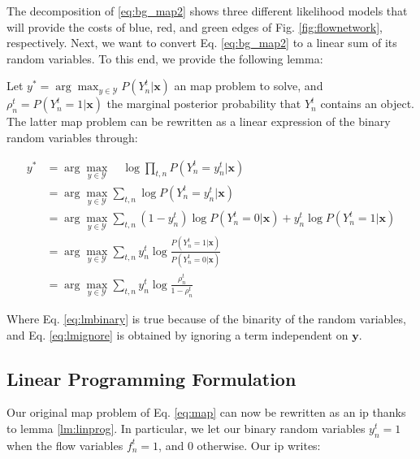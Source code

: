 The decomposition of \ref{eq:bg_map2} shows three different likelihood models that will provide the costs of blue, red, and green edges of Fig. \ref{fig:flownetwork}, respectively.
Next, we want to convert Eq. \ref{eq:bg_map2} to a linear sum of its random variables.
To this end, we provide the following lemma:

\begin{lemma}
  \label{lm:linprog}
  Let $y^{*}=\arg\max_{y\in\mathcal{Y}}P(Y^{t}_{n}|\bm{x})$ an \gls{map} problem to solve, and $\rho^{t}_{n}=P(Y^{t}_{n}=1|\bm{x})$ the marginal posterior probability that $Y^{t}_{n}$ contains an object.
  The latter \gls{map} problem can be rewritten as a linear expression of the binary random variables through:

  \begin{align}
    y^{*} &= \arg \max_{y\in\mathcal{Y}} \quad \log \prod_{t,n} P(Y^{t}_{n}=y^{t}_{n}|\bm{x})\\
          &= \arg \max_{y\in\mathcal{Y}} \sum_{t,n} \log P(Y^{t}_{n}=y^{t}_{n}|\bm{x}) \\
    &= \arg \max_{y\in\mathcal{Y}} \sum_{t,n} (1-y^{t}_{n})\log P(Y^{t}_{n}=0|\bm{x}) + y^{t}_{n}\log P(Y^{t}_{n}=1|\bm{x}) \label{eq:lmbinary}\\
    &= \arg \max_{y\in\mathcal{Y}} \sum_{t,n} y^{t}_{n}\log \frac{P(Y^{t}_{n}=1|\bm{x})}{P(Y^{t}_{n}=0|\bm{x})} \label{eq:lmignore}\\
    &= \arg \max_{y\in\mathcal{Y}} \sum_{t,n} y^{t}_{n}\log \frac{\rho^{t}_{n}}{1-\rho^{t}_{n}}
  \end{align}

Where Eq. \ref{eq:lmbinary} is true because of the binarity of the random variables, and Eq. \ref{eq:lmignore} is obtained by ignoring a term independent on $\bm{y}$.
\end{lemma}

\subsection{Linear Programming Formulation}
Our original \gls{map} problem of Eq. \ref{eq:map} can now be rewritten as an \gls{ip} thanks to lemma \ref{lm:linprog}.
In particular, we let our binary random variables $y^{t}_{n}=1$ when the flow variables $f^{t}_{n}=1$, and $0$ otherwise.
Our \gls{ip} writes:

